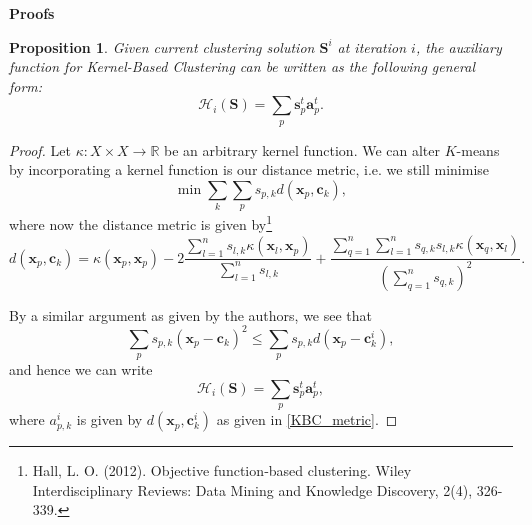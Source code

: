 \documentclass{article}
\DeclareMathOperator*{\argmin}{arg\,min}
\newtheorem{prop}{Proposition}
\begin{document}
{\Large \textbf{Proofs}}

\bigskip

\begin{prop}
Given current clustering solution $\mathbf{S}^i$ at iteration $i$, the auxiliary function for Kernel-Based Clustering can be written as the following general form:
$$\mathcal{H}_i(\mathbf{S}) = \sum_p \textbf{s}_p^t  \textbf{a}_p^t.$$
\end{prop}
\begin{proof}
Let $\kappa: X \times X \to \mathbb{R}$ be an arbitrary kernel function. We can alter $K$-means by incorporating a kernel function is our distance metric, i.e. we still minimise
$$\min \sum_k \sum_p s_{p,k} d(\textbf{x}_p, \textbf{c}_k),$$
where now the distance metric is given by\footnote{Hall, L. O. (2012). Objective function‐based clustering. Wiley Interdisciplinary Reviews: Data Mining and Knowledge Discovery, 2(4), 326-339.}
\begin{equation}
\label{KBC_metric}
  d(\textbf{x}_p, \textbf{c}_k) = \kappa(\textbf{x}_p, \textbf{x}_p) - 2 \frac{\sum_{l=1}^n s_{l, k} \kappa(\textbf{x}_l, \textbf{x}_p)}{\sum_{l=1}^n s_{l, k}} + \frac{\sum_{q=1}^n \sum_{l=1}^n s_{q, k} s_{l, k} \kappa(\textbf{x}_q, \textbf{x}_l)}{(\sum_{q=1}^n s_{q, k})^2}.
\end{equation}

By a similar argument as given by the authors, we see that
$$\sum_p s_{p, k}(\textbf{x}_p - \textbf{c}_k)^2 \leq \sum_p s_{p, k}d(\textbf{x}_p - \textbf{c}^i_k),$$
and hence we can write
\begin{equation*}
    \mathcal{H}_i(\mathbf{S}) = \sum_p \textbf{s}_p^t  \textbf{a}_p^t,
\end{equation*}
where $a_{p, k}^i$ is given by $d(\textbf{x}_p, \textbf{c}_k^i)$ as given in \ref{KBC_metric}.\end{proof}

\end{document}
